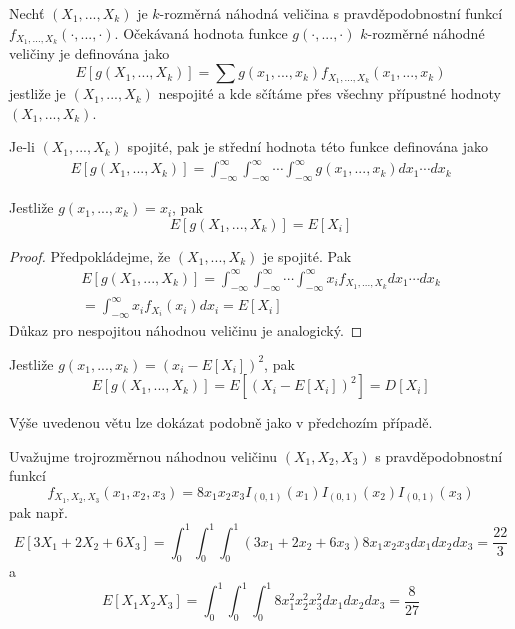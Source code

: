 \begin{definition}
Nechť $(X_1, ..., X_k)$ je $k$-rozměrná náhodná veličina s pravděpodobnostní funkcí $f_{X_1, ..., X_k}(\cdot, ..., \cdot)$. Očekávaná hodnota funkce $g(\cdot, ..., \cdot)$ $k$-rozměrné náhodné veličiny je definována jako
\begin{equation*}
E[g(X_1, ..., X_k)] = \sum g(x_1, ..., x_k)f_{X_1, ..., X_k}(x_1, ..., x_k)
\end{equation*}
jestliže je $(X_1, ..., X_k)$ nespojité a kde sčítáme přes všechny přípustné hodnoty $(X_1, ..., X_k)$.

Je-li $(X_1, ..., X_k)$ spojité, pak je střední hodnota této funkce definována jako
\begin{gather*}
E[g(X_1, ..., X_k)] = \int_{-\infty}^{\infty} \int_{-\infty}^{\infty} \cdots \int_{-\infty}^{\infty} g(x_1, ..., x_k)dx_1 \cdots dx_k
\end{gather*}
\end{definition}

\begin{theorem}
Jestliže $g(x_1, ..., x_k) = x_i$, pak
\begin{equation*}
E[g(X_1, ..., X_k)] = E[X_i]
\end{equation*}
\end{theorem}

\begin{proof}
Předpokládejme, že $(X_1, ..., X_k)$ je spojité. Pak
\begin{gather*}
E[g(X_1, ..., X_k)] = \int_{-\infty}^{\infty} \int_{-\infty}^{\infty} \cdots \int_{-\infty}^{\infty} x_i f_{X_1, ..., X_k}dx_1 \cdots dx_k\\
=\int_{-\infty}^{\infty}x_i f_{X_i}(x_i)dx_i = E[X_i]
\end{gather*}
Důkaz pro nespojitou náhodnou veličinu je analogický.
\end{proof}

\begin{theorem}
Jestliže $g(x_1, ..., x_k) = (x_i - E[X_i])^2$, pak
\begin{equation*}
E[g(X_1, ..., X_k)] = E[(X_i - E[X_i])^2] = D[X_i]
\end{equation*}
\end{theorem}

Výše uvedenou větu lze dokázat podobně jako v předchozím případě.

\begin{example}
Uvažujme trojrozměrnou náhodnou veličinu $(X_1, X_2, X_3)$ s pravděpodobnostní funkcí
\begin{equation*}
f_{X_1, X_2, X_3}(x_1, x_2, x_3) = 8 x_1 x_2 x_3 I_{(0, 1)}(x_1)I_{(0,1)}(x_2)I_{(0,1)}(x_3)
\end{equation*}
pak např.
\begin{equation*}
E[3X_1 + 2X_2 + 6X_3] = \int_0^1  \int_0^1  \int_0^1 (3x_1 + 2x_2 + 6x_3)8x_1 x_2 x_3 dx_1 dx_2 dx_3 = \frac{22}{3}
\end{equation*}
a
\begin{equation*}
E[X_1 X_2 X_3] = \int_0^1  \int_0^1  \int_0^1 8 x_1^2 x_2^2 x_3^2 dx_1 dx_2 dx_3 = \frac{8}{27}
\end{equation*}
\end{example}

